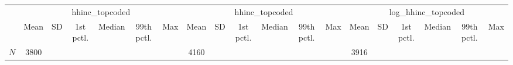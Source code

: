 {
\def\sym#1{\ifmmode^{#1}\else\(^{#1}\)\fi}
\begin{tabular}{l*{3}{cccccc}}
\hline\hline
            &\multicolumn{6}{c}{hhinc\_topcoded}                                           &\multicolumn{6}{c}{hhinc\_topcoded}                                           &\multicolumn{6}{c}{log\_hhinc\_topcoded}                                       \\
            &        Mean&          SD&   1st pctl.&      Median&  99th pctl.&         Max&        Mean&          SD&   1st pctl.&      Median&  99th pctl.&         Max&        Mean&          SD&   1st pctl.&      Median&  99th pctl.&         Max\\
\hline
\hline
\(N\)       &        3800&            &            &            &            &            &        4160&            &            &            &            &            &        3916&            &            &            &            &            \\
\hline\hline
\end{tabular}
}
